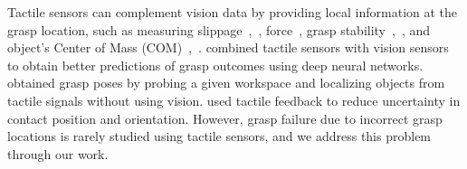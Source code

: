 

Tactile sensors can complement vision data by providing local information at the grasp location, such as measuring slippage~\cite{shear-slip},~\cite{biomim-slip}, force~\cite{vision-touch}, grasp stability~\cite{grasp-stability},~\cite{objPoseSpecificGrasps}, \cite{graspStabilityCNN} and object's Center of Mass (COM)~\cite{weightdist},~\cite{chris-COM}. \cite{predict_grasp} combined tactile sensors with vision sensors to obtain better predictions of grasp outcomes using deep neural networks.
\cite{graspingwithouteye} obtained grasp poses by probing a given workspace and localizing objects from tactile signals without using vision. \cite{analyticGraspSuccess} used tactile feedback to reduce uncertainty in contact position and orientation. However, grasp failure due to incorrect grasp locations is rarely studied using tactile sensors, and we address this problem through our work.



